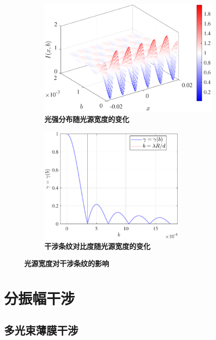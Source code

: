 \documentclass[UTF8]{report}
\theoremstyle{MyLineTheoremStyle} %
\theoremstyle{MyBlockTheoremStyle} %
\theoremstyle{MySubsubsectionStyle} %
\begin{document}
\begin{figure}[H]\centering
\begin{subfigure}[t]{0.5\columnwidth}\centering
    \includegraphics[height=160pt]{assets/3/光强分布.pdf}
    \caption{\bfseries 光强分布随光源宽度的变化 }
\end{subfigure}\hfill
\begin{subfigure}[t]{0.5\columnwidth}\centering
    \includegraphics[height=160pt]{assets/3/干涉条纹对比度.pdf}
    \caption{\bfseries 干涉条纹对比度随光源宽度的变化 }
\end{subfigure}
\caption{\bfseries 光源宽度对干涉条纹的影响 }\label{光源宽度}
\end{figure}

\section{分振幅干涉}

\subsection{多光束薄膜干涉}

\end{document}
